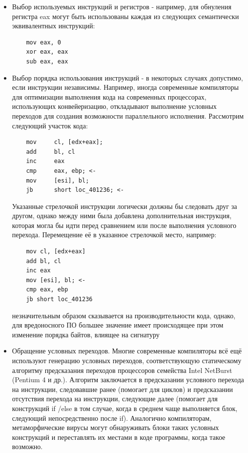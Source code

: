 \begin {itemize}
	\item Выбор используемых инструкций и регистров - например, для обнуления регистра eax могут быть использованы каждая из следующих семантически эквивалентных инструкций:
	\begin{lstlisting}
	mov eax, 0
	xor eax, eax
	sub eax, eax
	\end{lstlisting}
	\item Выбор порядка использования инструкций - в некоторых случаях допустимо, если инструкции независимы. Например, иногда современные компиляторы для оптимизации выполнения кода на современных процессорах, использующих конвейеризацию, откладывают выполнение условных переходов для создания возможности параллельного исполнения. Рассмотрим следующий участок кода:
	\begin{lstlisting}
	mov     cl, [edx+eax];
	add     bl, cl
	inc     eax
	cmp     eax, ebp; <-
	mov     [esi], bl;
	jb      short loc_401236; <-
	\end{lstlisting}
	Указанные стрелочкой инструкции логически должны бы следовать друг за другом, однако между ними была добавлена дополнительная инструкция, которая могла бы идти перед сравнением или после выполнения условного перехода. Перемещение её в указанное стрелочкой место, например:
	\begin{lstlisting}
	mov cl, [edx+eax]
	add bl, cl
	inc eax
	mov [esi], bl; <-
	cmp eax, ebp
	jb short loc_401236
	\end{lstlisting}
незначительным образом сказывается на производительности кода, однако, для вредоносного ПО большее значение имеет происходящее при этом изменение порядка байтов, влиящее на сигнатуру
	\item Обращение условных переходов. Многие современные компиляторы всё ещё используют генерацию условных переходов, соответствующую статическому алгоритму предсказания переходов процессоров семейства Intel NetBurst (Pentium 4 и др.)\cite{INTELMANUAL}. Алгоритм заключается в предсказании условного перехода на инструкции, следовавшие ранее (помогает для циклов) и предсказании отсутствия перехода на инструкции, следующие далее (помогает для конструкций if /else в том случае, когда в среднем чаще выполняется блок, следующий непосредственно после if). Аналогично компиляторам, метаморфические вирусы могут обнаруживать блоки таких условных конструкций и переставлять их местами в коде программы, когда такое возможно.


\end{itemize}
